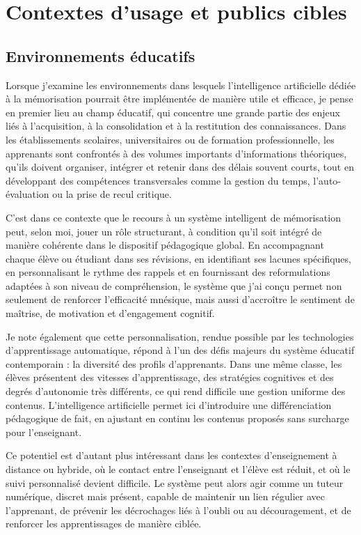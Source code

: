 \documentclass[11pt,a4paper]{report}
\begin{document}
\section{Contextes d’usage et publics cibles}

\subsection{Environnements éducatifs}

Lorsque j’examine les environnements dans lesquels l’intelligence artificielle dédiée à la mémorisation pourrait être implémentée de manière utile et efficace, je pense en premier lieu au champ éducatif, qui concentre une grande partie des enjeux liés à l’acquisition, à la consolidation et à la restitution des connaissances. Dans les établissements scolaires, universitaires ou de formation professionnelle, les apprenants sont confrontés à des volumes importants d’informations théoriques, qu’ils doivent organiser, intégrer et retenir dans des délais souvent courts, tout en développant des compétences transversales comme la gestion du temps, l’auto-évaluation ou la prise de recul critique.

C’est dans ce contexte que le recours à un système intelligent de mémorisation peut, selon moi, jouer un rôle structurant, à condition qu’il soit intégré de manière cohérente dans le dispositif pédagogique global. En accompagnant chaque élève ou étudiant dans ses révisions, en identifiant ses lacunes spécifiques, en personnalisant le rythme des rappels et en fournissant des reformulations adaptées à son niveau de compréhension, le système que j’ai conçu permet non seulement de renforcer l’efficacité mnésique, mais aussi d’accroître le sentiment de maîtrise, de motivation et d’engagement cognitif.

Je note également que cette personnalisation, rendue possible par les technologies d’apprentissage automatique, répond à l’un des défis majeurs du système éducatif contemporain : la diversité des profils d’apprenants. Dans une même classe, les élèves présentent des vitesses d’apprentissage, des stratégies cognitives et des degrés d’autonomie très différents, ce qui rend difficile une gestion uniforme des contenus. L’intelligence artificielle permet ici d’introduire une différenciation pédagogique de fait, en ajustant en continu les contenus proposés sans surcharge pour l’enseignant.

Ce potentiel est d’autant plus intéressant dans les contextes d’enseignement à distance ou hybride, où le contact entre l’enseignant et l’élève est réduit, et où le suivi personnalisé devient difficile. Le système peut alors agir comme un tuteur numérique, discret mais présent, capable de maintenir un lien régulier avec l’apprenant, de prévenir les décrochages liés à l’oubli ou au découragement, et de renforcer les apprentissages de manière ciblée.
\end{document}
